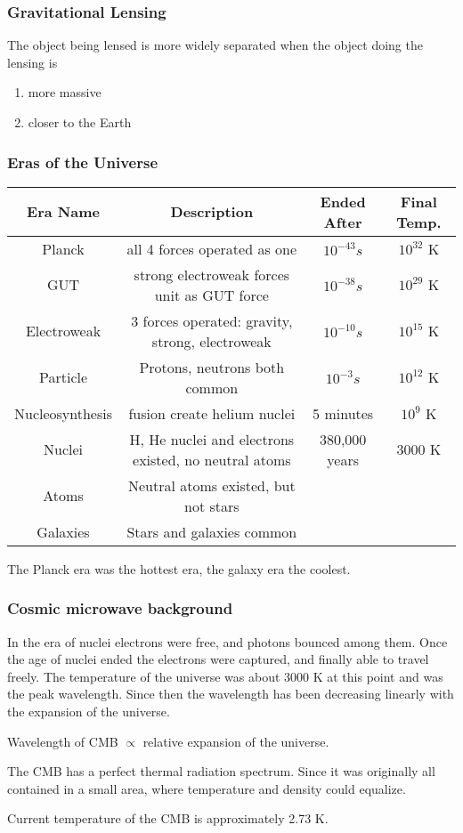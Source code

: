 \subsubsection{Gravitational Lensing}

The object being lensed is more widely separated when the object doing the lensing is
\begin{enumerate}
\item more massive
\item closer to the Earth
\end{enumerate}

\subsubsection{Eras of the Universe}

\begin{tabular}{c|c|c|c}
Era Name        & Description                                          & Ended After   & Final Temp. \\ \hline
Planck          & all 4 forces operated as one                         & $10^{-43} s$  & $10^{32}$ K \\
GUT             & strong electroweak forces unit as GUT force          & $10^{-38} s$  & $10^{29}$ K \\
Electroweak     & 3 forces operated: gravity, strong, electroweak      & $10^{-10} s$  & $10^{15}$ K \\
Particle        & Protons, neutrons both common                        & $10^{-3} s$   & $10^{12}$ K \\
Nucleosynthesis & fusion create helium nuclei                          & 5 minutes     & $10^{9}$ K \\
Nuclei          & H, He nuclei and electrons existed, no neutral atoms & 380,000 years & $3000$ K \\
Atoms           & Neutral atoms existed, but not stars                 &               & \\
Galaxies        & Stars and galaxies common                            &               &
\end{tabular}

The Planck era was the hottest era, the galaxy era the coolest.

\subsubsection{Cosmic microwave background}
In the era of nuclei electrons were free, and photons bounced among them.  Once the age of nuclei ended the electrons were captured, and finally able to travel freely.  The temperature of the universe was about 3000 K at this point and was the peak wavelength.  Since then the wavelength has been decreasing linearly with the expansion of the universe.

Wavelength of CMB $\propto$ relative expansion of the universe.

The CMB has a perfect thermal radiation spectrum.  Since it was originally all contained in a small area, where temperature and density could equalize.

Current temperature of the CMB is approximately 2.73 K.
